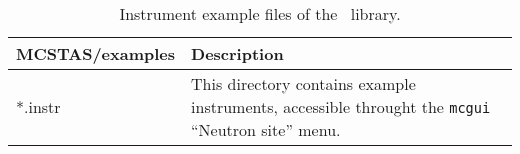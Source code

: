 \begin{table}
  \begin{center}
    {\let\my=\\
    \begin{tabular}{|p{}|p{}|}
      \hline
       {\bf MCSTAS/examples} & Description \\
      \hline
      *.instr & This directory contains example instruments, accessible throught the \verb+mcgui+ ``Neutron site'' menu. \\
      \hline
    \end{tabular}
    \caption{Instrument example files of the \MCS\ library.}
    \label{t:comp-instr}
    }
  \end{center}
\end{table}

